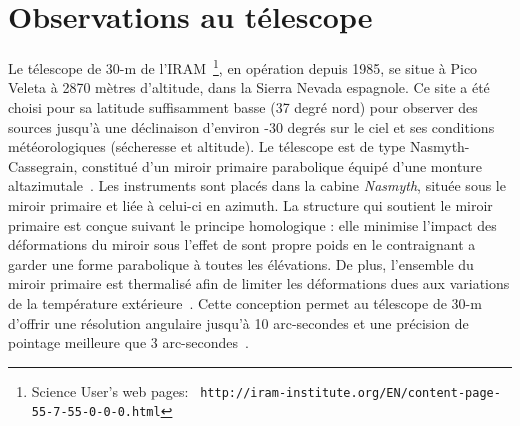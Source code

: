 \section{Observations au télescope}
\label{se:observations}

Le télescope de 30-m de l'IRAM~\footnote{Science User's web pages: {\tt
  http://iram-institute.org/EN/content-page-55-7-55-0-0-0.html}}, en
opération depuis 1985, se situe à Pico Veleta
à 2870 mètres d'altitude, dans la Sierra Nevada espagnole. Ce site a
été choisi pour sa latitude suffisamment basse (37 degré nord) pour
observer des sources jusqu'à une déclinaison d'environ -30
degrés sur le ciel et ses conditions météorologiques (sécheresse et
altitude). Le télescope est de type Nasmyth-Cassegrain, constitué d'un
miroir primaire parabolique équipé d'une monture
altazimutale~\citep{Baars1987}. Les instruments sont placés dans la
cabine \emph{Nasmyth}, située sous le miroir primaire et liée à
celui-ci en azimuth. La structure qui soutient le miroir primaire est conçue
suivant le principe homologique : elle minimise l'impact des
déformations du miroir sous l'effet de sont propre poids en le
contraignant a garder une forme parabolique à toutes les
élévations. De plus, l'ensemble du miroir primaire est thermalisé afin
de limiter les déformations dues aux variations de la température
extérieure~\citep{Baars1988}. Cette conception permet au télescope de
30-m d'offrir une résolution angulaire jusqu'à 10 arc-secondes et une
précision de pointage meilleure que 3 arc-secondes~\citep{Greve1996}.  


